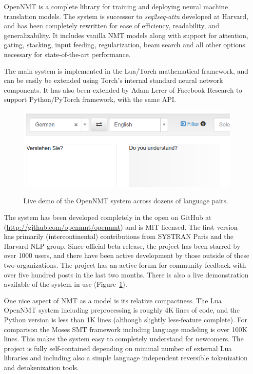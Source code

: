 \documentclass[11pt,a4paper]{article}
\begin{document}
OpenNMT is a complete library for training and deploying neural
machine translation models. The system is successor to
\textit{seq2seq-attn} developed at Harvard, and has been completely
rewritten for ease of efficiency, readability, and
generalizability. It includes vanilla NMT models along with support
for attention, gating, stacking, input feeding, regularization, beam
search and all other options necessary for state-of-the-art
performance.  

The main system is implemented in the Lua/Torch mathematical
framework, and can be easily be extended using Torch's internal
standard neural network components. It has also been extended by Adam
Lerer of Facebook Research to support Python/PyTorch framework, 
with the same API.

\begin{figure}
  \centering
  \includegraphics[width=\linewidth]{demo}
  \label{fig:live}
  \caption{\small Live demo of the OpenNMT system across dozens of language pairs.}
\end{figure}


The system has been developed completely in the open on GitHub at
(\url{http://github.com/opennmt/opennmt}) and is MIT licensed.  The
first version has primarily (intercontinental) contributions from
SYSTRAN Paris and the Harvard NLP group. Since official beta release,
the project has been starred by over 1000 users, and there have been
active development by those outside of these two organizations. The
project has an active forum for community feedback with over five
hundred posts in the last two months. There is also a live
demonstration available of the system in use (Figure~\ref{fig:live}).


One nice aspect of NMT as a model is its relative compactness. The Lua
OpenNMT system including preprocessing is roughly 4K lines of code,
and the Python version is less than 1K lines (although slightly
less-feature complete). For comparison the Moses SMT framework
including language modeling is over 100K lines. This makes the system
easy to completely understand for newcomers. The project is fully
self-contained depending on minimal number of external Lua libraries
and including also a simple language independent reversible
tokenization and detokenization tools.
\end{document}

